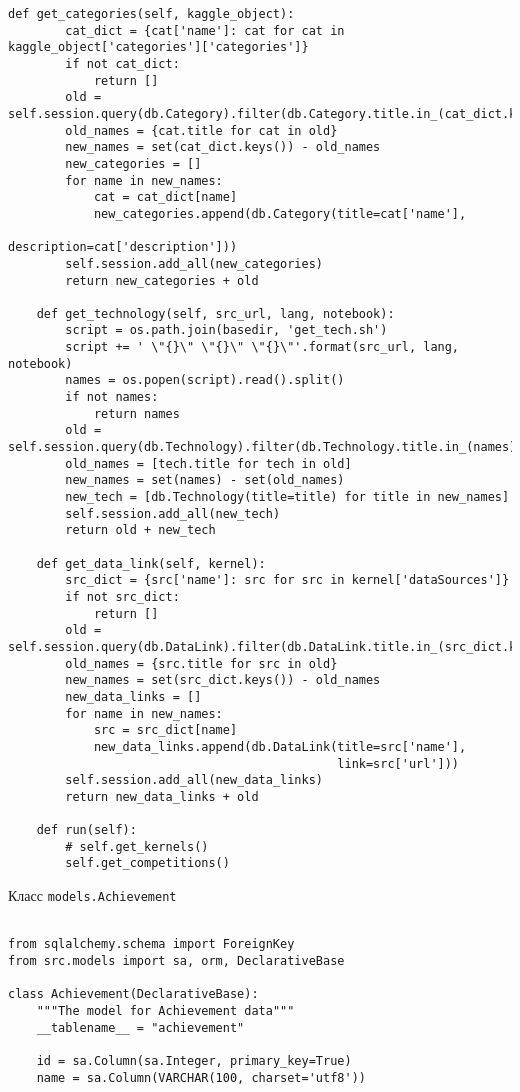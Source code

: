 \begin{lstlisting}[style=app]
    def get_categories(self, kaggle_object):
        cat_dict = {cat['name']: cat for cat in kaggle_object['categories']['categories']}
        if not cat_dict:
            return []
        old = self.session.query(db.Category).filter(db.Category.title.in_(cat_dict.keys())).all()
        old_names = {cat.title for cat in old}
        new_names = set(cat_dict.keys()) - old_names
        new_categories = []
        for name in new_names:
            cat = cat_dict[name]
            new_categories.append(db.Category(title=cat['name'],
                                              description=cat['description']))
        self.session.add_all(new_categories)
        return new_categories + old

    def get_technology(self, src_url, lang, notebook):
        script = os.path.join(basedir, 'get_tech.sh')
        script += ' \"{}\" \"{}\" \"{}\"'.format(src_url, lang, notebook)
        names = os.popen(script).read().split()
        if not names:
            return names
        old = self.session.query(db.Technology).filter(db.Technology.title.in_(names)).all()
        old_names = [tech.title for tech in old]
        new_names = set(names) - set(old_names)
        new_tech = [db.Technology(title=title) for title in new_names]
        self.session.add_all(new_tech)
        return old + new_tech

    def get_data_link(self, kernel):
        src_dict = {src['name']: src for src in kernel['dataSources']}
        if not src_dict:
            return []
        old = self.session.query(db.DataLink).filter(db.DataLink.title.in_(src_dict.keys())).all()
        old_names = {src.title for src in old}
        new_names = set(src_dict.keys()) - old_names
        new_data_links = []
        for name in new_names:
            src = src_dict[name]
            new_data_links.append(db.DataLink(title=src['name'],
                                              link=src['url']))
        self.session.add_all(new_data_links)
        return new_data_links + old

    def run(self):
        # self.get_kernels()
        self.get_competitions()

\end{lstlisting}

\begin{center}Класс \texttt{models.Achievement}\end{center}

\begin{lstlisting}[style=app]

from sqlalchemy.schema import ForeignKey
from src.models import sa, orm, DeclarativeBase

class Achievement(DeclarativeBase):
    """The model for Achievement data"""
    __tablename__ = "achievement"

    id = sa.Column(sa.Integer, primary_key=True)
    name = sa.Column(VARCHAR(100, charset='utf8'))

\end{lstlisting}

